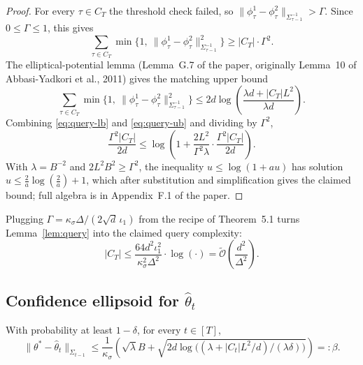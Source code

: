 \documentclass[11pt]{article}
\newcommand{\Otilde}{\tilde{\mathcal{O}}}
\begin{document}
\begin{proof}
For every $\tau \in C_T$ the threshold check failed, so $\|\phi_\tau^1 - \phi_\tau^2\|_{\Sigma_{\tau-1}^{-1}} > \Gamma$. Since $0 \le \Gamma \le 1$, this gives
\begin{equation}
  \sum_{\tau \in C_T} \min\!\bigl\{1,\ \|\phi_\tau^1 - \phi_\tau^2\|_{\Sigma_{\tau-1}^{-1}}^2\bigr\}
  \ge |C_T| \cdot \Gamma^2.
  \label{eq:query-lb}
\end{equation}
The elliptical-potential lemma (Lemma~G.7 of the paper, originally Lemma~10 of Abbasi-Yadkori et al., 2011) gives the matching upper bound
\begin{equation}
  \sum_{\tau \in C_T} \min\!\bigl\{1,\ \|\phi_\tau^1 - \phi_\tau^2\|_{\Sigma_{\tau-1}^{-1}}^2\bigr\}
  \le 2d \log\!\left( \frac{\lambda d + |C_T| L^2}{\lambda d} \right).
  \label{eq:query-ub}
\end{equation}
Combining \eqref{eq:query-lb} and \eqref{eq:query-ub} and dividing by $\Gamma^2$,
\[
  \frac{\Gamma^2 |C_T|}{2d}
  \le \log\!\left( 1 + \frac{2 L^2}{\Gamma^2 \lambda} \cdot \frac{\Gamma^2 |C_T|}{2d} \right).
\]
With $\lambda = B^{-2}$ and $2L^2 B^2 \ge \Gamma^2$, the inequality $u \le \log(1 + a u)$ has solution $u \le \tfrac{2}{a}\log(\tfrac{2}{a}) + 1$, which after substitution and simplification gives the claimed bound; full algebra is in Appendix~F.1 of the paper.
\end{proof}

Plugging $\Gamma = \kappa_\sigma \Delta / (2 \sqrt{d}\, \iota_1)$ from the recipe of Theorem~5.1 turns Lemma~\ref{lem:query} into the claimed query complexity:
\[
  |C_T|
  \le \frac{64 d^2 \iota_1^2}{\kappa_\sigma^2 \Delta^2} \cdot \log(\cdot)
  = \Otilde\!\left( \frac{d^2}{\Delta^2} \right).
\]

\subsection{Confidence ellipsoid for $\hat\theta_t$}

\begin{lemma}
\label{lem:conf}
With probability at least $1 - \delta$, for every $t \in [T]$,
\[
  \|\theta^* - \hat\theta_t\|_{\Sigma_{t-1}}
  \le \frac{1}{\kappa_\sigma}\!\left( \sqrt{\lambda} B + \sqrt{2 d \log\bigl((\lambda + |C_t| L^2 / d)/(\lambda \delta)\bigr)} \right)
  =: \beta.
\]
\end{lemma}
\end{document}
